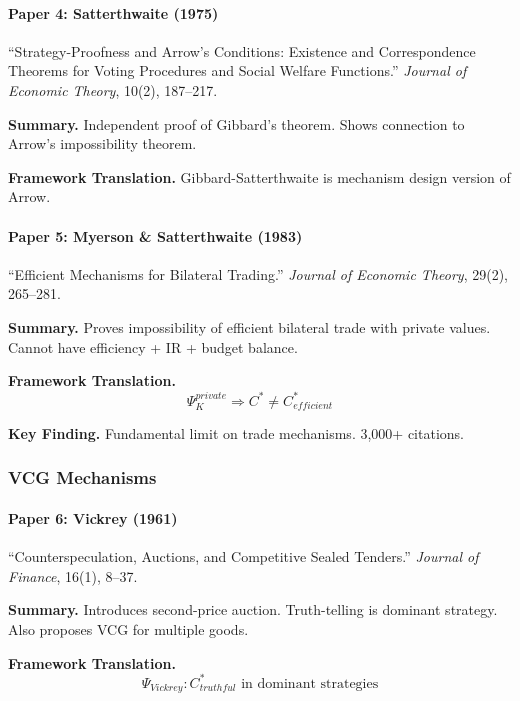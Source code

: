 \paragraph{Paper 4: Satterthwaite (1975)}

``Strategy-Proofness and Arrow's Conditions: Existence and Correspondence 
Theorems for Voting Procedures and Social Welfare Functions.''
\textit{Journal of Economic Theory}, 10(2), 187--217.

\textbf{Summary.}
Independent proof of Gibbard's theorem. Shows connection to Arrow's 
impossibility theorem.

\textbf{Framework Translation.}
Gibbard-Satterthwaite is mechanism design version of Arrow.

\paragraph{Paper 5: Myerson \& Satterthwaite (1983)}

``Efficient Mechanisms for Bilateral Trading.''
\textit{Journal of Economic Theory}, 29(2), 265--281.

\textbf{Summary.}
Proves impossibility of efficient bilateral trade with private values.
Cannot have efficiency + IR + budget balance.

\textbf{Framework Translation.}
\begin{equation}
\Psi_K^{private} \Rightarrow C^* \neq C^*_{efficient}
\end{equation}

\textbf{Key Finding.}
Fundamental limit on trade mechanisms. 3,000+ citations.

\subsubsection{VCG Mechanisms}

\paragraph{Paper 6: Vickrey (1961)}

``Counterspeculation, Auctions, and Competitive Sealed Tenders.''
\textit{Journal of Finance}, 16(1), 8--37.

\textbf{Summary.}
Introduces second-price auction. Truth-telling is dominant strategy.
Also proposes VCG for multiple goods.

\textbf{Framework Translation.}
\begin{equation}
\Psi_{Vickrey}: C^*_{truthful} \text{ in dominant strategies}
\end{equation}


